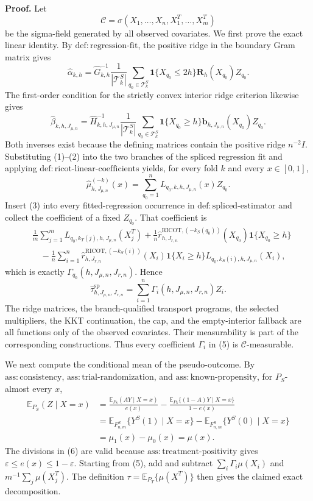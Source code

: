 \textbf{Proof.}
Let
\[
\mathcal C=\sigma(X_1,\ldots,X_n,X_1^T,\ldots,X_m^T)
\]
be the sigma-field generated by all observed covariates.  We first prove the exact
linear identity.  By \(\mathrm{def:regression\text{-}fit}\), the positive ridge in
the boundary Gram matrix gives
\[
\widehat\alpha_{k,h}
=\widehat G_{k,h}^{-1}\frac{1}{|\mathcal T_k^S|}
\sum_{q_0\in\mathcal T_k^S}\mathbf 1\{X_{q_0}\le 2h\}
\mathbf R_h(X_{q_0})Z_{q_0}.
\tag{1}
\]
The first-order condition for the strictly convex interior ridge criterion likewise
gives
\[
\widehat\beta_{k,h,J_{\mu,n}}
=\widehat H_{k,h,J_{\mu,n}}^{-1}\frac{1}{|\mathcal T_k^S|}
\sum_{q_0\in\mathcal T_k^S}\mathbf 1\{X_{q_0}\ge h\}
\mathbf b_{h,J_{\mu,n}}(X_{q_0})Z_{q_0}.
\tag{2}
\]
Both inverses exist because the defining matrices contain the positive ridge
\(n^{-2}I\).  Substituting (1)--(2) into the two branches of the spliced regression
fit and applying \(\mathrm{def:ricot\text{-}linear\text{-}coefficients}\) yields,
for every fold \(k\) and every \(x\in[0,1]\),
\[
\widehat\mu^{(-k)}_{h,J_{\mu,n}}(x)
=\sum_{q_0=1}^nL_{q_0,k,h,J_{\mu,n}}(x)Z_{q_0}.
\tag{3}
\]
Insert (3) into every fitted-regression occurrence in
\(\mathrm{def:spliced\text{-}estimator}\) and collect the coefficient of a fixed
\(Z_{q_0}\).  That coefficient is
\[
\begin{aligned}
{}&\frac1m\sum_{j=1}^m
L_{q_0,k_T(j),h,J_{\mu,n}}(X_j^T)
+\frac1n\widehat r^{\mathrm{RICOT},(-k_S(q_0))}_{h,J_{r,n}}(X_{q_0})
\mathbf 1\{X_{q_0}\ge h\}\\
&\quad-\frac1n\sum_{i=1}^n
\widehat r^{\mathrm{RICOT},(-k_S(i))}_{h,J_{r,n}}(X_i)
\mathbf 1\{X_i\ge h\}L_{q_0,k_S(i),h,J_{\mu,n}}(X_i),
\end{aligned}
\tag{4}
\]
which is exactly \(\Gamma_{q_0}(h,J_{\mu,n},J_{r,n})\).  Hence
\[
\widehat\tau^{\mathrm{sp}}_{h,J_{\mu,n},J_{r,n}}
=\sum_{i=1}^n\Gamma_i(h,J_{\mu,n},J_{r,n})Z_i.
\tag{5}
\]
The ridge matrices, the branch-qualified transport programs, the selected
multipliers, the KKT continuation, the cap, and the empty-interior fallback are all
functions only of the observed covariates.  Their measurability is part of the
corresponding constructions.  Thus every coefficient \(\Gamma_i\) in (5) is
\(\mathcal C\)-measurable.

We next compute the conditional mean of the pseudo-outcome.  By
\(\mathrm{ass:consistency}\), \(\mathrm{ass:trial\text{-}randomization}\), and
\(\mathrm{ass:known\text{-}propensity}\), for \(P_S\)-almost every \(x\),
\[
\begin{aligned}
\mathbb E_{P_S}(Z\mid X=x)
&=\frac{\mathbb E_{P_S}(AY\mid X=x)}{e(x)}
-\frac{\mathbb E_{P_S}\{(1-A)Y\mid X=x\}}{1-e(x)}\\
&=\mathbb E_{F^S_{n,m}}\{Y^S(1)\mid X=x\}
-\mathbb E_{F^S_{n,m}}\{Y^S(0)\mid X=x\}\\
&=\mu_1(x)-\mu_0(x)=\mu(x).
\end{aligned}
\tag{6}
\]
The divisions in (6) are valid because
\(\mathrm{ass:treatment\text{-}positivity}\) gives
\(\varepsilon\le e(x)\le1-\varepsilon\).  Starting from (5), add and subtract
\(\sum_i\Gamma_i\mu(X_i)\) and
\(m^{-1}\sum_j\mu(X_j^T)\).  The definition
\(\tau=\mathbb E_{P_T}\{\mu(X^T)\}\) then gives the claimed exact decomposition.

